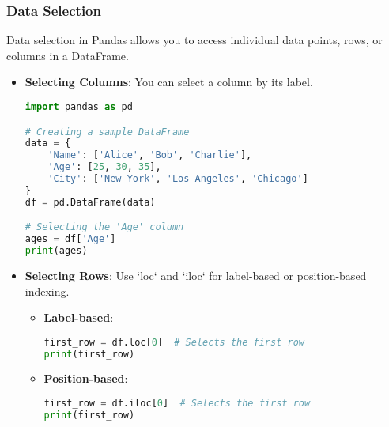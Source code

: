 \documentclass[aspectratio=169]{beamer}
\begin{document}
\begin{frame}[fragile]
    \frametitle{Data Selection}
    Data selection in Pandas allows you to access individual data points, rows, or columns in a DataFrame.
    
    \begin{itemize}
        \item \textbf{Selecting Columns}: You can select a column by its label.
        \begin{lstlisting}[language=Python]
import pandas as pd

# Creating a sample DataFrame
data = {
    'Name': ['Alice', 'Bob', 'Charlie'],
    'Age': [25, 30, 35],
    'City': ['New York', 'Los Angeles', 'Chicago']
}
df = pd.DataFrame(data)

# Selecting the 'Age' column
ages = df['Age']
print(ages)
        \end{lstlisting}
        
        \item \textbf{Selecting Rows}: Use `loc` and `iloc` for label-based or position-based indexing.
        \begin{itemize}
            \item \textbf{Label-based}:
            \begin{lstlisting}[language=Python]
first_row = df.loc[0]  # Selects the first row
print(first_row)
            \end{lstlisting}
            \item \textbf{Position-based}:
            \begin{lstlisting}[language=Python]
first_row = df.iloc[0]  # Selects the first row
print(first_row)
            \end{lstlisting}
        \end{itemize}
    \end{itemize}
\end{frame}
\end{document}
